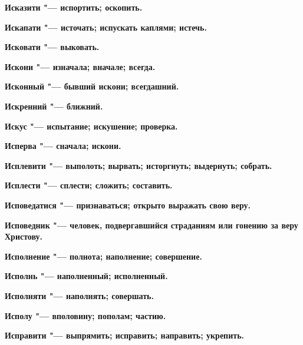 \bfseries Исказити \normalfont{} "--- испортить; оскопить. 




\bfseries Искапати \normalfont{} "--- источать; испускать каплями; истечь. 




\bfseries Исковати \normalfont{} "--- выковать. 




\bfseries Искони \normalfont{} "--- изначала; вначале; всегда. 




\bfseries Исконный \normalfont{} "--- бывший искони; всегдашний. 




\bfseries Искренний \normalfont{} "--- ближний. 




\bfseries Искус \normalfont{} "--- испытание; искушение; проверка. 




\bfseries Исперва \normalfont{} "--- сначала; искони. 




\bfseries Исплевити \normalfont{} "--- выполоть; вырвать; исторгнуть; выдернуть; собрать. 




\bfseries Исплести \normalfont{} "--- сплести; сложить; составить. 




\bfseries Исповедатися \normalfont{} "--- признаваться; открыто выражать свою веру. 




\bfseries Исповедник \normalfont{} "--- человек, подвергавшийся страданиям или гонению за веру Христову. 




\bfseries Исполнение \normalfont{} "--- полнота; наполнение; совершение. 




\bfseries Исполнь \normalfont{} "--- наполненный; исполненный. 




\bfseries Исполняти \normalfont{} "--- наполнять; совершать. 




\bfseries Исполу \normalfont{} "--- вполовину; пополам; частию. 




\bfseries Исправити \normalfont{} "--- выпрямить; исправить; направить; укрепить. 




